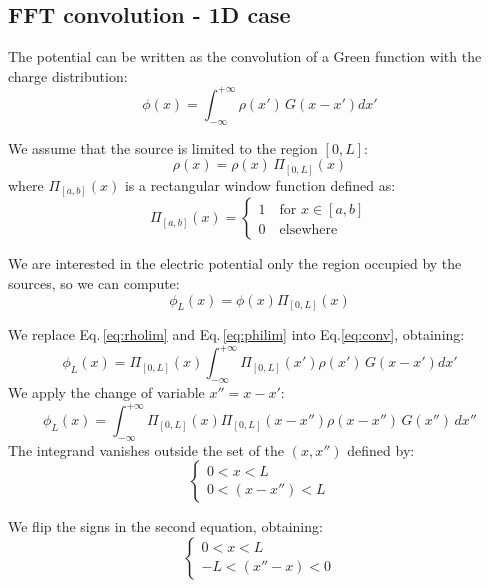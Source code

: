 \subsection{FFT convolution - 1D case}
\label{sec:fftconv1d}
The potential can be written as the convolution of a Green function with the charge distribution:
\begin{equation}
\phi(x) = \int_{-\infty}^{+\infty} \rho(x')\,G(x-x') dx'
\label{eq:conv}
\end{equation}

We assume that the source is limited to the region  $[0, L]$:
\begin{equation}
\rho(x) = \rho(x)\,\Pi_{[0,L]}\left(x\right)
\label{eq:rholim}
\end{equation}
where $\Pi_{[a,b]}(x)$ is a rectangular window function defined as:
\begin{equation}
\Pi_{[a,b]}(x) = 
\begin{cases}
1\quad\text{for } x \in [a, b]\\
0\quad\text{elsewhere}
\end{cases}
\end{equation}

We are interested in the electric potential only the region occupied by the sources, so we can compute:
\begin{equation}
\phi_L(x) = \phi(x) \Pi_{[0, L]}\left(x\right)
\label{eq:philim}
\end{equation}

We replace Eq.\,\eqref{eq:rholim} and Eq.\,\eqref{eq:philim} into Eq.\eqref{eq:conv}, obtaining:
\begin{equation}
\phi_L(x) = \Pi_{[0,L]}\left( x\right)
\int_{-\infty}^{+\infty} 
\Pi_{[0,L]}\left(x'\right)
\rho(x')\,G(x-x') dx'
\end{equation}
We apply the change of variable $x'' = x - x'$:
\begin{equation}
\phi_L(x) = 
\int_{-\infty}^{+\infty} 
\Pi_{[0,L]}\left({x}\right)
\Pi_{[0,L]}\left({x-x''}\right)
\rho(x-x'')\,G(x'') \,dx''
\label{eq:conv1}
\end{equation}
The integrand vanishes outside the set of the $(x, x'')$ defined by:
\begin{equation}
\begin{cases}
0 < x <{L}\\
0 < (x-x'') <{L}
\end{cases}
\end{equation}

We flip the signs in the second equation, obtaining:
\begin{equation}
\begin{cases}
0 < x <{L}\\
-L < (x''-x) <0
\end{cases}
\end{equation}

